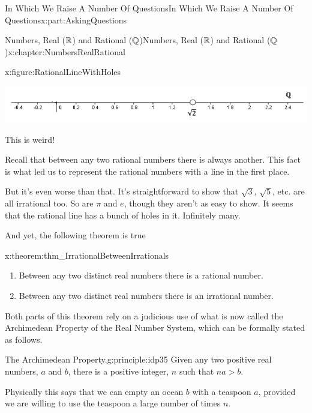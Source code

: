 \begin{partptx}{In Which We Raise A Number Of Questions}{}{In Which We Raise A Number Of Questions}{}{}{x:part:AskingQuestions}
\begin{chapterptx}{Numbers, Real (\(\mathbb {R}\)) and Rational (\(\mathbb {Q}\))}{}{Numbers, Real (\(\mathbb {R}\)) and Rational (\(\mathbb {Q}\))}{}{}{x:chapter:NumbersRealRational}
\begin{introduction}{}
\begin{figureptx}{}{x:figure:RationalLineWithHoles}{}
\begin{image}{0}{1}{0}
					\includegraphics[width=\linewidth]{external/images/RationalLineWithHoles.png}
				\end{image}%
				\tcblower
			\end{figureptx}%
			This is weird!%
			\par
			Recall that between any two rational numbers there is always another. This fact is what led us to represent the rational numbers with a line in the first place.%
			\par
			But it's even worse than that. It's straightforward to show that \(\sqrt{3}\), \(\sqrt{5}\), etc. are all irrational too. So are \(\pi\) and \(e\), though they aren't as easy to show. It seems that the rational line has a bunch of holes in it. Infinitely many.%
			\par
			And yet, the following theorem is true%
			\begin{theorem}{}{}{x:theorem:thm_IrrationalBetweenIrrationals}%
				\begin{enumerate}[label=(\alph*)]
					\item{}Between any two distinct real numbers there is a rational number.%
					\item{}Between any two distinct real numbers there is an irrational number.%
				\end{enumerate}
			\end{theorem}
			Both parts of this theorem rely on a judicious use of what is now called the Archimedean Property of the Real Number System, which can be formally stated as follows.%
			\begin{principle}{The Archimedean Property.}{}{g:principle:idp35}%
				 Given any two positive real numbers, \(a\) and \(b\), there is a positive integer, \(n\) such that \(na>b\).%
			\end{principle}
			Physically this says that we can empty an ocean \(b\) with a teaspoon \(a\), provided we are willing to use the teaspoon a large number of times \(n\).%
			\par

\end{introduction}
\end{chapterptx}
\end{partptx}

